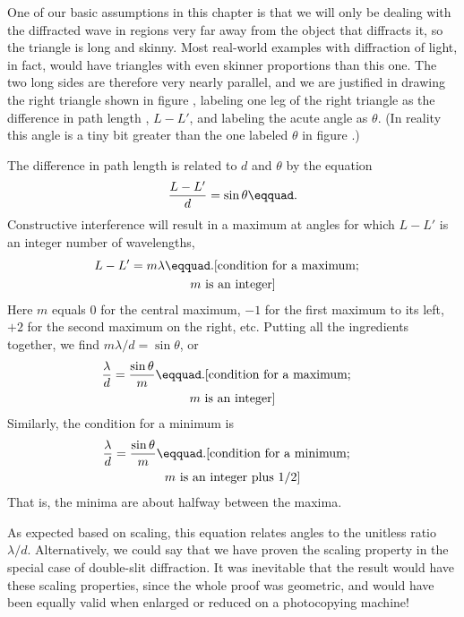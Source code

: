 One of our basic assumptions in this chapter is that we will
only be dealing with the diffracted wave in regions very far
away from the object that diffracts it, so the triangle is
long and skinny. Most real-world examples with diffraction
of light, in fact, would have triangles with even skinner
proportions than this one. The two long sides are therefore
very nearly parallel, and we are justified in drawing the
right triangle shown in figure , labeling one leg of the
right triangle as the difference in path length , $L-L'$,
and labeling the acute angle as $\theta $. (In reality this
angle is a tiny bit greater than the one labeled $\theta $
in figure .)

The difference in path length is related to $d$ and
$\theta $ by the equation
\begin{equation*}
        \frac{L-L'}{d}          =  \sin  \theta\eqquad.
\end{equation*}
Constructive interference will result in a maximum at angles
for which $L-L'$ is an integer number of wavelengths,
\begin{multline*}
        L-L'  =  m\lambda\eqquad. \hfill
                  \shoveright{\text{[condition for a maximum;}}\\
                  \text{$m$ is an integer]}
\end{multline*}
Here $m$ equals 0 for the central maximum, $-1$ for the first
maximum to its left, $+2$ for the second maximum on the right,
etc. Putting all the ingredients together, we find 
$m\lambda/d=\sin \theta $, or
\begin{multline*}
        \frac{\lambda}{d} = \frac{\sin\theta}{m}\eqquad. \hfill
                  \shoveright{\text{[condition for a maximum;}}\\
                  \text{$m$ is an integer]}
\end{multline*}
Similarly, the condition for a minimum is
\begin{multline*}
        \frac{\lambda}{d} = \frac{\sin\theta}{m}\eqquad. \hfill
                  \shoveright{\text{[condition for a minimum;}}\\
                  \text{$m$ is an integer plus $1/2$]}
\end{multline*}
That is, the minima are about halfway between the maxima.

\vspace{2mm plus 3mm}

As expected based on scaling, this equation relates angles
to the unitless ratio $\lambda /d$. Alternatively, we could
say that we have proven the scaling property in the special
case of double-slit diffraction. It was inevitable that the
result would have these scaling properties, since the whole
proof was geometric, and would have been equally valid when
enlarged or reduced on a photocopying machine!

